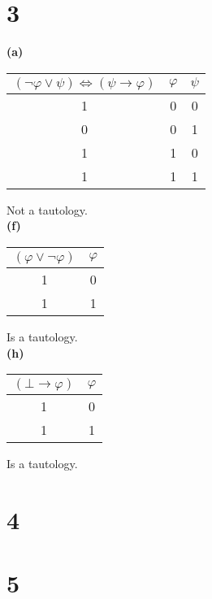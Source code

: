 \documentclass[10pt]{article}
\begin{document}

\section*{3}

\textbf{(a)}

\begin{tabular}{ c || c | c }			
  $(\lnot \varphi \lor \psi) \iff (\psi \to \varphi)$ & $\varphi$ & $\psi$ \\
  \hline
  1 & 0 & 0 \\
  0 & 0 & 1 \\
  1 & 1 & 0 \\
  1 & 1 & 1 \\
  \hline  
\end{tabular}
Not a tautology.\\


\noindent \textbf{(f)}

\begin{tabular}{ c || c }			
  $(\varphi \lor \lnot \varphi)$ & $\varphi$ \\
  \hline
  1 & 0 \\
  1 & 1 \\
  \hline  
\end{tabular}
Is a tautology.\\

\noindent \textbf{(h)}

\begin{tabular}{ c || c }			
  $(\bot \to \varphi)$ & $\varphi$ \\
  \hline
  1 & 0 \\
  1 & 1 \\
  \hline  
\end{tabular}
Is a tautology.


\section*{4}




\section*{5}


\end{document}
